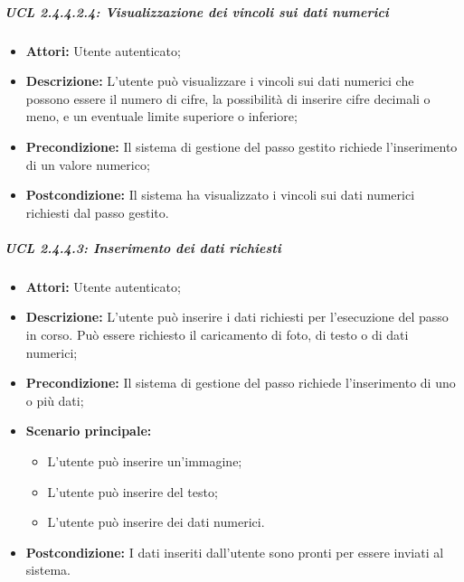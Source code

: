 \subparagraph{UCL 2.4.4.2.4: Visualizzazione dei vincoli sui dati numerici}
\begin{itemize}
\item \textbf{Attori:} Utente autenticato;
\item \textbf{Descrizione:} L'utente può visualizzare i vincoli sui dati numerici che possono essere il numero di cifre, la possibilità di inserire cifre decimali o meno, e un eventuale limite superiore o inferiore;
\item \textbf{Precondizione:} Il sistema di gestione del passo gestito richiede l'inserimento di un valore numerico;
\item \textbf{Postcondizione:} Il sistema ha visualizzato i vincoli sui dati numerici richiesti dal passo gestito.
\end{itemize}

\subparagraph{UCL 2.4.4.3: Inserimento dei dati richiesti}
\begin{itemize}
\item \textbf{Attori:} Utente autenticato;
\item \textbf{Descrizione:} L'utente può inserire i dati richiesti per l'esecuzione del passo in corso. Può essere richiesto il caricamento di foto, di testo o di dati numerici; 
\item \textbf{Precondizione:} Il sistema di gestione del passo richiede l'inserimento di uno o più dati;
\item \textbf{Scenario principale:}
\begin{itemize}
\item L'utente può inserire un'immagine;
\item L'utente può inserire del testo;
\item L'utente può inserire dei dati numerici.
\end{itemize}
\item \textbf{Postcondizione:} I dati inseriti dall'utente sono pronti per essere inviati al sistema.
\end{itemize}

